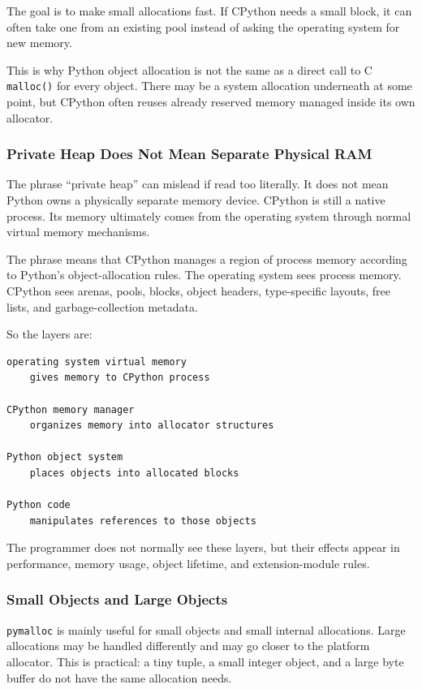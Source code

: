 The goal is to make small allocations fast. If CPython needs a small block, it can often take one from an existing pool instead of asking the operating system for new memory.

This is why Python object allocation is not the same as a direct call to C \texttt{malloc()} for every object. There may be a system allocation underneath at some point, but CPython often reuses already reserved memory managed inside its own allocator.

\subsubsection*{Private Heap Does Not Mean Separate Physical RAM}

The phrase ``private heap'' can mislead if read too literally. It does not mean Python owns a physically separate memory device. CPython is still a native process. Its memory ultimately comes from the operating system through normal virtual memory mechanisms.

The phrase means that CPython manages a region of process memory according to Python's object-allocation rules. The operating system sees process memory. CPython sees arenas, pools, blocks, object headers, type-specific layouts, free lists, and garbage-collection metadata.

So the layers are:

\begin{verbatim}
operating system virtual memory
    gives memory to CPython process

CPython memory manager
    organizes memory into allocator structures

Python object system
    places objects into allocated blocks

Python code
    manipulates references to those objects
\end{verbatim}

The programmer does not normally see these layers, but their effects appear in performance, memory usage, object lifetime, and extension-module rules.

\subsubsection*{Small Objects and Large Objects}

\texttt{pymalloc} is mainly useful for small objects and small internal allocations. Large allocations may be handled differently and may go closer to the platform allocator. This is practical: a tiny tuple, a small integer object, and a large byte buffer do not have the same allocation needs.

